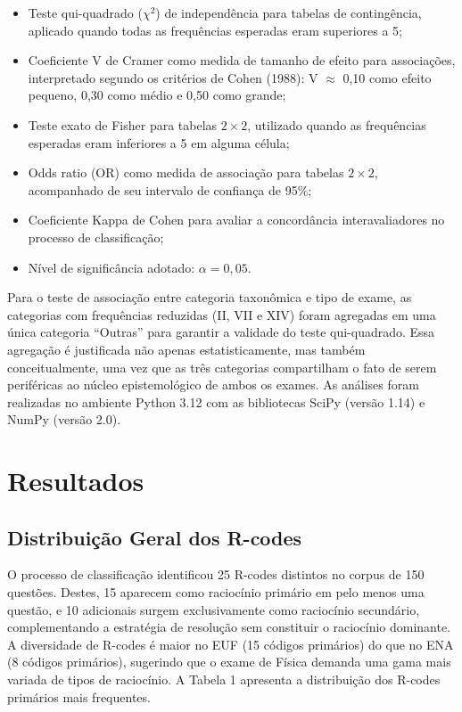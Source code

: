 \documentclass[
  12pt,
  a4paper,
  twoside,
  brazilian
]{article}
\providecommand{\tightlist}{%
  \setlength{\itemsep}{0pt}\setlength{\parskip}{0pt}}
\begin{document}
\begin{itemize}
\tightlist
\item
  Teste qui-quadrado (\(\chi^2\)) de independência para tabelas de
  contingência, aplicado quando todas as frequências esperadas eram
  superiores a 5;
\item
  Coeficiente V de Cramer como medida de tamanho de efeito para
  associações, interpretado segundo os critérios de Cohen (1988): V
  \(\approx\) 0,10 como efeito pequeno, 0,30 como médio e 0,50 como
  grande;
\item
  Teste exato de Fisher para tabelas \(2 \times 2\), utilizado quando as
  frequências esperadas eram inferiores a 5 em alguma célula;
\item
  Odds ratio (OR) como medida de associação para tabelas \(2 \times 2\),
  acompanhado de seu intervalo de confiança de 95\%;
\item
  Coeficiente Kappa de Cohen para avaliar a concordância
  interavaliadores no processo de classificação;
\item
  Nível de significância adotado: \(\alpha = 0,05\).
\end{itemize}

Para o teste de associação entre categoria taxonômica e tipo de exame,
as categorias com frequências reduzidas (II, VII e XIV) foram agregadas
em uma única categoria ``Outras'' para garantir a validade do teste
qui-quadrado. Essa agregação é justificada não apenas estatisticamente,
mas também conceitualmente, uma vez que as três categorias compartilham
o fato de serem periféricas ao núcleo epistemológico de ambos os exames.
As análises foram realizadas no ambiente Python 3.12 com as bibliotecas
SciPy (versão 1.14) e NumPy (versão 2.0).

\newpage
\section{Resultados}\label{resultados}

\subsection{Distribuição Geral dos
R-codes}\label{distribuiuxe7uxe3o-geral-dos-r-codes}

O processo de classificação identificou 25 R-codes distintos no corpus
de 150 questões. Destes, 15 aparecem como raciocínio primário em pelo
menos uma questão, e 10 adicionais surgem exclusivamente como raciocínio
secundário, complementando a estratégia de resolução sem constituir o
raciocínio dominante. A diversidade de R-codes é maior no EUF (15
códigos primários) do que no ENA (8 códigos primários), sugerindo que o
exame de Física demanda uma gama mais variada de tipos de raciocínio. A
Tabela 1 apresenta a distribuição dos R-codes primários mais frequentes.
\end{document}
